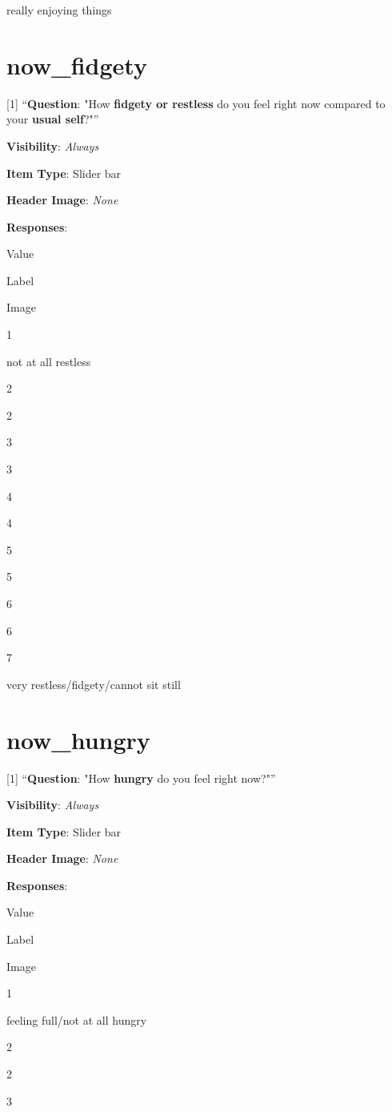 \documentclass[]{book}
\begin{document}
really enjoying things

\hypertarget{now_fidgety}{%
\section{now\_fidgety}\label{now_fidgety}}

{[}1{]} ``\textbf{Question}: "How \textbf{fidgety or restless} do you feel right now compared to your \textbf{usual self}?"''

\textbf{Visibility}: \emph{Always}

\textbf{Item Type}: Slider bar

\textbf{Header Image}: \emph{None}

\textbf{Responses}:

Value

Label

Image

1

not at all restless

2

2

3

3

4

4

5

5

6

6

7

very restless/fidgety/cannot sit still

\hypertarget{now_hungry}{%
\section{now\_hungry}\label{now_hungry}}

{[}1{]} ``\textbf{Question}: "How \textbf{hungry} do you feel right now?"''

\textbf{Visibility}: \emph{Always}

\textbf{Item Type}: Slider bar

\textbf{Header Image}: \emph{None}

\textbf{Responses}:

Value

Label

Image

1

feeling full/not at all hungry

2

2

3
\end{document}
